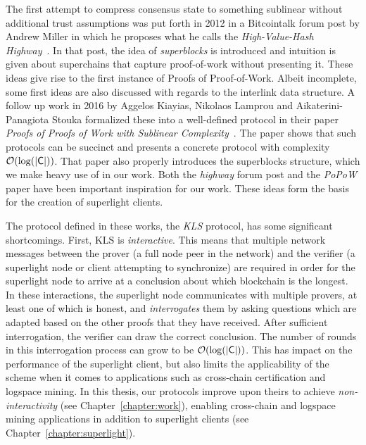 The first attempt to compress consensus state to something sublinear without
additional trust assumptions was put
forth in 2012 in a Bitcointalk forum post by Andrew Miller in which he proposes what he
calls the \emph{High-Value-Hash Highway}~\cite{highway}. In that post,
the idea of \emph{superblocks} is introduced and intuition is given about
superchains that capture proof-of-work without presenting it. These ideas give
rise to the first instance of Proofs of Proof-of-Work. Albeit incomplete, some
first ideas are also discussed with regards to the interlink data structure.
A follow up work in 2016 by
Aggelos Kiayias, Nikolaos Lamprou and Aikaterini-Panagiota Stouka formalized
these into a well-defined protocol in their paper
\emph{Proofs of Proofs of Work with Sublinear Complexity}~\cite{popow}. The
paper shows that such protocols can be succinct and presents a concrete protocol
with complexity $\mathcal{O}(\log(|\mathsf{C}|))$. That paper also properly introduces the
superblocks structure, which we make heavy use of in our work. Both the
\emph{highway} forum post and the \emph{PoPoW} paper have been important
inspiration for our work. These ideas form the basis for the creation of
superlight clients.

The protocol defined in these works, the \emph{KLS} protocol, has some
significant shortcomings. First, KLS is \emph{interactive}. This
means that multiple network messages between the prover (a full node peer in the
network) and the verifier (a superlight node or client attempting to
synchronize) are required in order for the superlight node to arrive at a
conclusion about which blockchain is the longest. In these interactions, the
superlight node communicates with multiple provers, at least one of which is
honest, and \emph{interrogates} them by asking questions which are adapted based
on the other proofs that they have received. After sufficient interrogation, the
verifier can draw the correct conclusion. The number of rounds in this
interrogation process can grow to be $\mathcal{O}(\log(|\mathsf{C}|))$. This has impact on
the performance of the superlight client, but also limits the applicability of
the scheme when it comes to applications such as cross-chain certification and
logspace mining. In this thesis, our protocols improve upon theirs to achieve
\emph{non-interactivity} (see Chapter~\ref{chapter:work}), enabling cross-chain
and logspace mining applications in addition to superlight clients (see
Chapter~\ref{chapter:superlight}).

